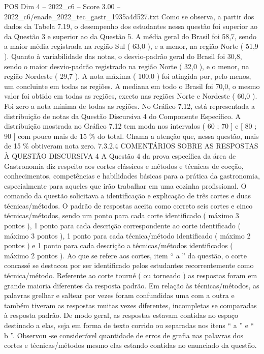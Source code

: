 \begin{textsample}{POS Dim 4 – 2022\_c6 – Score 3.00 – 2022\_c6/enade\_2022\_tec\_gastr\_1935a4d527.txt}
Como se observa, a partir dos dados da Tabela 7.19, o desempenho dos estudantes nessa questão foi superior ao da Questão 3 e superior ao da Questão 5.
A média geral do Brasil foi 58,7, sendo a maior média registrada na região Sul ( 63,0 ), e a menor, na região Norte ( 51,9 ).
Quanto à variabilidade das notas, o desvio-padrão geral do Brasil foi 30,8, sendo o maior desvio-padrão registrado na região Norte ( 32,0 ), e o menor, na região Nordeste ( 29,7 ).
A nota máxima ( 100,0 ) foi atingida por, pelo menos, um concluinte em todas as regiões.
A mediana em todo o Brasil foi 70,0, o mesmo valor foi obtido em todas as regiões, exceto nas regiões Norte e Nordeste ( 60,0 ).
Foi zero a nota mínima de todas as regiões.
No Gráfico 7.12, está representada a distribuição de notas da Questão Discursiva 4 do Componente Específico.
A distribuição mostrada no Gráfico 7.12 tem moda nos intervalos ( 60 ; 70 ] e [ 80 ; 90 ] com pouco mais de 15 \% do total.
Chama a atenção que, nessa questão, mais de 15 \% obtiveram nota zero. 7.3.2.4 COMENTÁRIOS SOBRE AS RESPOSTAS À QUESTÃO DISCURSIVA 4 A Questão 4 da prova específica da área de Gastronomia diz respeito aos cortes clássicos e métodos e técnicas de cocção, conhecimentos, competências e habilidades básicas para a prática da gastronomia, especialmente para aqueles que irão trabalhar em uma cozinha profissional.
O comando da questão solicitava a identificação e explicação de três cortes e duas técnicas/métodos.
O padrão de respostas aceita como correto seis cortes e cinco técnicas/métodos, sendo um ponto para cada corte identificado ( máximo 3 pontos ), 1 ponto para cada descrição correspondente ao corte identificado ( máximo 3 pontos ), 1 ponto para cada técnica/método identificado ( máximo 2 pontos ) e 1 ponto para cada descrição a técnicas/métodos identificados ( máximo 2 pontos ).
Ao que se refere aos cortes, item “ a ” da questão, o corte concassé se destacou por ser identificado pelos estudantes recorrentemente como técnica/método.
Referente ao corte tourné ( ou torneado ) as respostas foram em grande maioria diferentes da resposta padrão.
Em relação às técnicas/métodos, as palavras grelhar e saltear por vezes foram confundidas uma com a outra e também tiveram as respostas muitas vezes diferentes, incompletas se comparadas à resposta padrão.
De modo geral, as respostas estavam contidas no espaço destinado a elas, seja em forma de texto corrido ou separadas nos itens “ a ” e “ b ”.
Observou -se considerável quantidade de erros de grafia nas palavras dos cortes e técnicas/métodos mesmo elas estando contidas no enunciado da questão.

\end{textsample}
